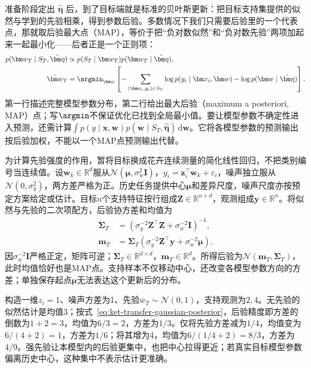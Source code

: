 准备阶段定出 $\hat{\bm\eta}$ 后，到了目标端就是标准的贝叶斯更新：把目标支持集提供的似然与学到的先验相乘，得到参数后验。多数情况下我们只需要后验里的一个代表点，那就取后验最大点（MAP），等价于把“负对数似然”和“负对数先验”两项加起来一起最小化——后者正是一个正则项：
\begin{align}
  p(\bm w_T\mid S_T,\hat{\bm\eta})
  &\propto p(S_T\mid\bm w_T)p(\bm w_T\mid\hat{\bm\eta}), \nonumber\\
  \hat{\bm w}_T
  &=\argmin_{\bm w}\left[
       -\sum_{(\bm x_i,y_i)\in S_T}\log p(y_i\mid\bm x_i,\bm w)
       -\log p(\bm w\mid\hat{\bm\eta})\right].
  \label{eq:ket-transfer-map}
\end{align}
第一行描述完整模型参数分布，第二行给出最大后验（maximum a posteriori, MAP）点；写$\argmin$不保证优化已找到全局最小值。要让模型参数不确定性进入预测，还需计算$\int p(y\mid\bm x,\bm w)p(\bm w\mid S_T,\hat{\bm\eta})\,\mathrm d\bm w$。它将各模型参数的预测输出按后验加权，不能以一个MAP点预测输出代替。

为计算先验强度的作用，暂将目标换成花卉连续测量的简化线性回归，不把类别编号当连续值。设$\bm w_k\in\mathbb R^d$服从$\mathcal N(\bm\mu,\sigma_w^2\bm I)$，$y_i=\bm z_i^\top\bm w_k+\varepsilon_i$，噪声独立服从$\mathcal N(0,\sigma_y^2)$，两方差严格为正。历史任务提供中心$\bm\mu$和差异尺度，噪声尺度亦按预定方案给定或估计。目标$n$个支持特征按行组成$\bm Z\in\mathbb R^{n\times d}$，观测组成$\bm y\in\mathbb R^n$。将似然与先验的二次项配方，后验协方差和均值为
\begin{align}
  \bm\Sigma_T
    &=\left(\sigma_y^{-2}\bm Z^\top\bm Z
                     +\sigma_w^{-2}\bm I\right)^{-1}, \nonumber\\
  \bm m_T
    &=\bm\Sigma_T\left(\sigma_y^{-2}\bm Z^\top\bm y
                     +\sigma_w^{-2}\bm\mu\right).
  \label{eq:ket-transfer-gaussian-posterior}
\end{align}
因$\sigma_w^{-2}\bm I$严格正定，矩阵可逆；$\bm\Sigma_T\in\mathbb R^{d\times d}$，$\bm m_T\in\mathbb R^d$。所得后验为$\mathcal N(\bm m_T,\bm\Sigma_T)$，此时均值恰好也是MAP点。支持样本不仅移动中心，还改变各模型参数方向的方差；单独保存起点$\bm\mu$无法表达这个更新后的分布。

\begin{example}[先验怎样改变少样本估计]
  \label{ex:ket-transfer-prior-numeric}
  构造一维$z_i=1$、噪声方差为1、先验$w_T\sim\mathcal N(0,1)$，支持观测为$2,4$。无先验的似然估计是均值3；按式~\eqref{eq:ket-transfer-gaussian-posterior}，后验精度即方差的倒数为$1+2=3$，均值为$6/3=2$，方差为$1/3$。仅将先验方差减为$1/4$，均值变为$6/(4+2)=1$，方差为$1/6$；将其增为4，均值为$6/(1/4+2)=8/3$，方差为$4/9$。强先验让本模型内的后验更集中，也把中心拉得更近；若真实目标模型参数偏离历史中心，这种集中不表示估计更准确。
\end{example}

